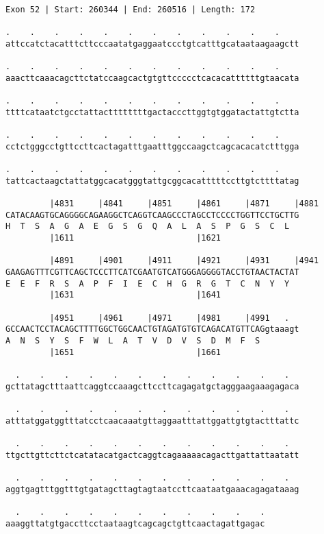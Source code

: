 \documentclass{article}
\begin{document}
\begin{Verbatim}[fontfamily=courier]
Exon 52 | Start: 260344 | End: 260516 | Length: 172

.    .    .    .    .    .    .    .    .    .    .    .    
attccatctacatttcttcccaatatgaggaatccctgtcatttgcataataagaagctt

.    .    .    .    .    .    .    .    .    .    .    .    
aaacttcaaacagcttctatccaagcactgtgttccccctcacacattttttgtaacata

.    .    .    .    .    .    .    .    .    .    .    .    
ttttcataatctgcctattacttttttttgactacccttggtgtggatactattgtctta

.    .    .    .    .    .    .    .    .    .    .    .    
cctctgggcctgttccttcactagatttgaatttggccaagctcagcacacatctttgga

.    .    .    .    .    .    .    .    .    .    .    .    
tattcactaagctattatggcacatgggtattgcggcacatttttccttgtcttttatag

         |4831     |4841     |4851     |4861     |4871     |4881
CATACAAGTGCAGGGGCAGAAGGCTCAGGTCAAGCCCTAGCCTCCCCTGGTTCCTGCTTG
H  T  S  A  G  A  E  G  S  G  Q  A  L  A  S  P  G  S  C  L  
         |1611                         |1621                

         |4891     |4901     |4911     |4921     |4931     |4941
GAAGAGTTTCGTTCAGCTCCCTTCATCGAATGTCATGGGAGGGGTACCTGTAACTACTAT
E  E  F  R  S  A  P  F  I  E  C  H  G  R  G  T  C  N  Y  Y  
         |1631                         |1641                

         |4951     |4961     |4971     |4981     |4991   .  
GCCAACTCCTACAGCTTTTGGCTGGCAACTGTAGATGTGTCAGACATGTTCAGgtaaagt
A  N  S  Y  S  F  W  L  A  T  V  D  V  S  D  M  F  S        
         |1651                         |1661                

  .    .    .    .    .    .    .    .    .    .    .    .  
gcttatagctttaattcaggtccaaagcttccttcagagatgctagggaagaaagagaca

  .    .    .    .    .    .    .    .    .    .    .    .  
atttatggatggtttatcctcaacaaatgttaggaatttattggattgtgtactttattc

  .    .    .    .    .    .    .    .    .    .    .    .  
ttgcttgttcttctcatatacatgactcaggtcagaaaaacagacttgattattaatatt

  .    .    .    .    .    .    .    .    .    .    .    .  
aggtgagtttggtttgtgatagcttagtagtaatccttcaataatgaaacagagataaag

  .    .    .    .    .    .    .    .    .    .    .
aaaggttatgtgaccttcctaataagtcagcagctgttcaactagattgagac
\end{Verbatim}
\end{document}
